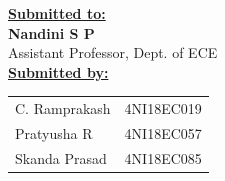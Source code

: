 \documentclass[a4paper,12pt]{report}
\begin{document}
\begin{titlepage}
\begin{center}
        \textbf{\underline{\large Submitted to:}} \\
        \textbf{\large Nandini S P} \\
        Assistant Professor, Dept. of ECE \\
        \vspace{1cm}
        \textbf{\underline{\large Submitted by:}} \\
        \vspace{0.5cm}
        \begin{tabular}[H]{l l}
            C. Ramprakash & 4NI18EC019 \\
            Pratyusha R & 4NI18EC057 \\
            Skanda Prasad & 4NI18EC085 \\
        \end{tabular}
    \end{center}
\end{titlepage}
\clearpage
\restoregeometry

\tableofcontents
\newpage

\listoffigures
\listoftables
\listoflistings
\newpage



\end{document}
